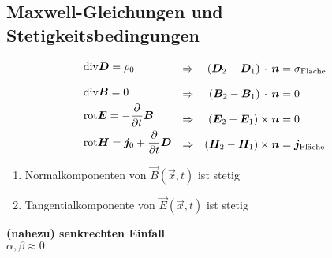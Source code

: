 
\subsection{Maxwell-Gleichungen und Stetigkeitsbedingungen}

\begin{comment}%
\begin{align*}
\tx{div} \vec{D} = \rho_0 \quad &\Rightarrow \quad \left(\vec{D}_2 - \vec{D}_1\right) \cdot \vec{n} = \sigma_{\tx{Fläche}}\\[5pt]
\tx{div} \vec{B} = 0 \quad &\Rightarrow \quad \left(\vec{B}_2 - \vec{B}_1\right) \cdot \vec{n} = 0\\
\tx{rot} \vec{E} = - \prt{}{t} \vec{B} \quad &\Rightarrow \quad \left(\vec{E}_2 - \vec{E}_1\right) \times \vec{n} = 0\\
\tx{rot} \vec{H} = \vec{j}_0 + \prt{}{t} \vec{D} \quad &\Rightarrow \quad \left(\vec{H}_2 - \vec{H}_1\right) \times \vec{n} = \vec{j}_{\tx{Fläche}}
\end{align*}
\end{comment}
\begin{equation*}
\begin{split}
&\textrm{div} \bm{D} = \rho_0 \\[8pt]
&\textrm{div} \bm{B} = 0 \\
&\textrm{rot} \bm{E} = - \frac{\partial }{\partial t} \bm{B} \\
&\textrm{rot} \bm{H} = \bm{j}_0 + \frac{\partial }{\partial t} \bm{D}
\end{split}
\begin{split}
\quad \Rightarrow \quad \\[8pt]
\quad \Rightarrow \quad \\[8pt]
\quad \Rightarrow \quad \\[8pt]
\quad \Rightarrow \quad 
\end{split}
\begin{split}
\left(\bm{D}_2 - \bm{D}_1\right) \, \cdot \, \bm{n} &= \sigma_{\textrm{Fläche}} \\[8pt]
\left(\bm{B}_2 - \bm{B}_1\right) \, \cdot \, \bm{n} &= 0 \\[8pt]
\left(\bm{E}_2 - \bm{E}_1\right) \times \bm{n} &= 0 \\[8pt]
\left(\bm{H}_2 - \bm{H}_1\right) \times \bm{n} &= \bm{j}_{\textrm{Fläche}}
\end{split}
\end{equation*}
\begin{enumerate}[$ \Rightarrow $]
	\item Normalkomponenten von $ \vec{B}(\vec{x},t) $ ist stetig
	\item Tangentialkomponente von $ \vec{E}(\vec{x},t) $ ist stetig
\end{enumerate}
\textbf{(nahezu) senkrechten Einfall}\\
$ \alpha,\beta \approx 0 $\\

